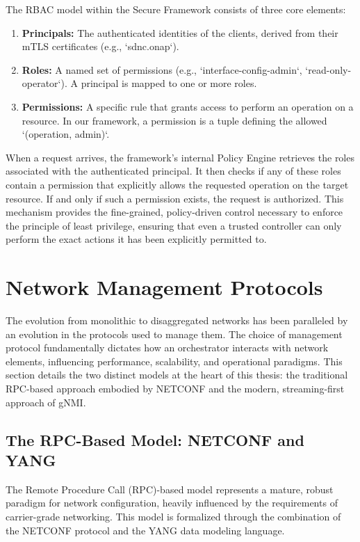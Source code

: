 \documentclass[12pt, a4paper, reqno, oneside]{book}
\begin{document}
The RBAC model within the Secure Framework consists of three core elements:
\begin{enumerate}
    \item \textbf{Principals:} The authenticated identities of the clients, derived from their mTLS certificates (e.g., `sdnc.onap`).
    \item \textbf{Roles:} A named set of permissions (e.g., `interface-config-admin`, `read-only-operator`). A principal is mapped to one or more roles.
    \item \textbf{Permissions:} A specific rule that grants access to perform an operation on a resource. In our framework, a permission is a tuple defining the allowed `(operation, admin)`.
\end{enumerate}

When a request arrives, the framework's internal Policy Engine retrieves the roles associated with the authenticated principal. It then checks if any of these roles contain a permission that explicitly allows the requested operation on the target resource. If and only if such a permission exists, the request is authorized. This mechanism provides the fine-grained, policy-driven control necessary to enforce the principle of least privilege, ensuring that even a trusted controller can only perform the exact actions it has been explicitly permitted to.

\section{Network Management Protocols}
\label{sec:net_mgmt_protocols}

The evolution from monolithic to disaggregated networks has been paralleled by an evolution in the protocols used to manage them. The choice of management protocol fundamentally dictates how an orchestrator interacts with network elements, influencing performance, scalability, and operational paradigms. This section details the two distinct models at the heart of this thesis: the traditional RPC-based approach embodied by NETCONF and the modern, streaming-first approach of gNMI.

\subsection{The RPC-Based Model: NETCONF and YANG}
\label{sec:rpc_model}

The Remote Procedure Call (RPC)-based model represents a mature, robust paradigm for network configuration, heavily influenced by the requirements of carrier-grade networking. This model is formalized through the combination of the NETCONF protocol and the YANG data modeling language.
\end{document}
